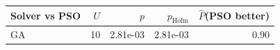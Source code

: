 \begin{tabular}{lrrrr}
\toprule
Solver vs PSO & $U$ & $p$ & $p_{\mathrm{Holm}}$ & $\hat{P}$(PSO better)\\
\midrule
GA & 10 & 2.81e-03 & 2.81e-03 & 0.90\\
\bottomrule
\end{tabular}

